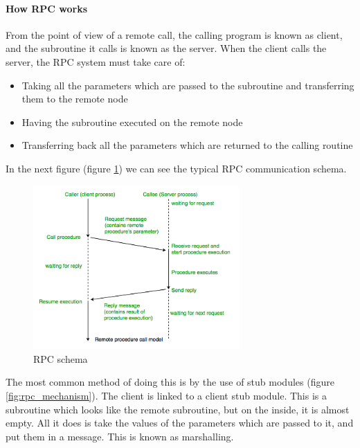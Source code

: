 \documentclass[a4paper, 12pt]{article} %
\begin{document}
            \paragraph{How RPC works}
                From the point of view of a remote call, the calling program is known as client, and the subroutine it calls is known as the server\cite{rpcInOS}\cite{howRPC}. When the client calls the server, the RPC system must take care of:
                \begin{itemize}
                    \item Taking all the parameters which are passed to the subroutine and transferring them to the remote node
                    \item Having the subroutine executed on the remote node
                    \item Transferring back all the parameters which are returned to the calling routine
                \end{itemize}
                
                In the next figure (figure \ref{fig:rpc_schema}) we can see the typical RPC communication schema.
                \begin{figure}[h]
                    \centering
                    \includegraphics[width=0.7\textwidth]{rpc.png}
                    \caption{RPC schema}
                    \label{fig:rpc_schema}
                \end{figure}
                The most common method of doing this is by the use of stub modules (figure \ref{fig:rpc_mechanism}). The client is linked to a client stub module. This is a subroutine which looks like the remote subroutine, but on the inside, it is almost empty. All it does is take the values of the parameters which are passed to it, and put them in a message. This is known as marshalling.\\
\end{document}
